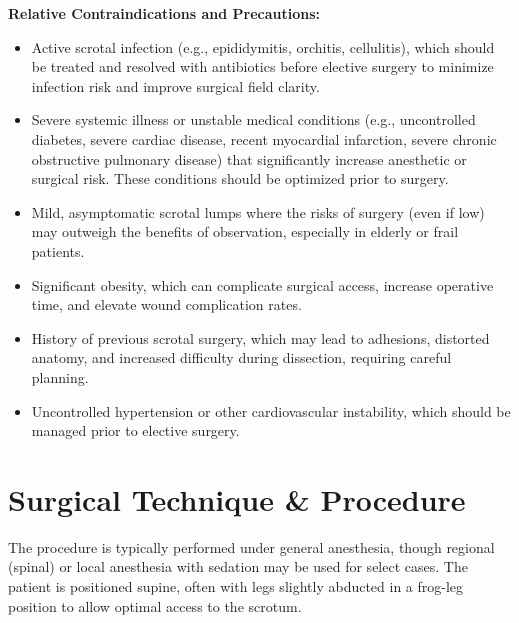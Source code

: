 \textbf{Relative Contraindications and Precautions:}
\begin{itemize}
  \item Active scrotal infection (e.g., epididymitis, orchitis, cellulitis), which should be treated and resolved with antibiotics before elective surgery to minimize infection risk and improve surgical field clarity.
  \item Severe systemic illness or unstable medical conditions (e.g., uncontrolled diabetes, severe cardiac disease, recent myocardial infarction, severe chronic obstructive pulmonary disease) that significantly increase anesthetic or surgical risk. These conditions should be optimized prior to surgery.
  \item Mild, asymptomatic scrotal lumps where the risks of surgery (even if low) may outweigh the benefits of observation, especially in elderly or frail patients.
  \item Significant obesity, which can complicate surgical access, increase operative time, and elevate wound complication rates.
  \item History of previous scrotal surgery, which may lead to adhesions, distorted anatomy, and increased difficulty during dissection, requiring careful planning.
  \item Uncontrolled hypertension or other cardiovascular instability, which should be managed prior to elective surgery.
\end{itemize}

\section*{Surgical Technique \& Procedure}
The procedure is typically performed under general anesthesia, though regional (spinal) or local anesthesia with sedation may be used for select cases. The patient is positioned supine, often with legs slightly abducted in a frog-leg position to allow optimal access to the scrotum.


